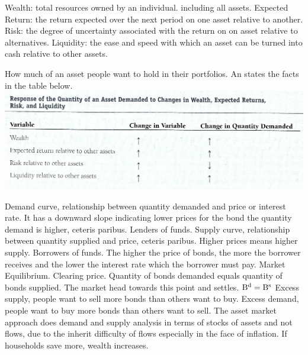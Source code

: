 \documentclass[12pt]{examnotes}
\begin{document}
\ra Wealth: total resources owned by an individual. including all assets.
\ra Expected Return: the return expected over the next period on one asset relative to another.
\ra Risk: the degree of uncertainty associated with the return on on asset relative to alternatives.
\ra Liquidity: the ease and speed with which an asset can be turned into cash relative to other assets.

\ra How much of an asset people want to hold in their portfolios. An states the facts in the table below. 
\vspace{6pt}
\includegraphics[scale=0.5]{./imgs/50.jpg}

\ra  Demand curve, relationship between quantity demanded and price or interest rate. It has a downward slope indicating lower prices for the bond the quantity demand is higher, ceteris paribus. Lenders of funds.
\ra Supply curve, relationship between quantity supplied and price, ceteris paribus. Higher prices means higher supply. Borrowers of funds. The higher the price of bonds, the more the borrower receives and the lower the interest rate which the borrower must pay.
\ra Market Equilibrium. Clearing price. Quantity of bonds demanded equals quantity of bonds supplied. The market head towards this point and settles. $\rm{B^d}=\rm{B^s}$
\ra Excess supply, people want to sell more bonds than others want to buy. 
\ra Excess demand, people want to buy more bonds than others want to sell. 
\ra The asset market approach does demand and supply analysis in terms of stocks of assets and not flows, due to the inherit difficulty of flows especially in the face of inflation.
\ra If households save more, wealth increases.
\end{document}
